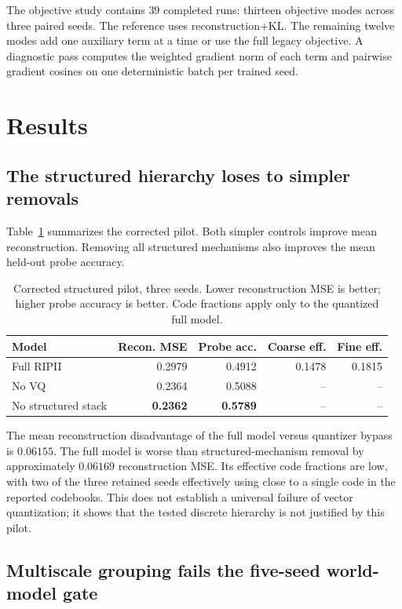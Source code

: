 \documentclass[10pt]{article}
\newcommand{\RIPII}{\textsc{RIPII}}
\begin{document}
The objective study contains $39$ completed runs: thirteen objective modes across three paired seeds. The reference uses reconstruction+KL. The remaining twelve modes add one auxiliary term at a time or use the full legacy objective. A diagnostic pass computes the weighted gradient norm of each term and pairwise gradient cosines on one deterministic batch per trained seed.

\section{Results}

\subsection{The structured hierarchy loses to simpler removals}

Table~\ref{tab:pilot} summarizes the corrected pilot. Both simpler controls improve mean reconstruction. Removing all structured mechanisms also improves the mean held-out probe accuracy.

\begin{table}[t]
\centering
\caption{Corrected structured pilot, three seeds. Lower reconstruction MSE is better; higher probe accuracy is better. Code fractions apply only to the quantized full model.}
\label{tab:pilot}
\begin{tabular}{lrrrr}
\toprule
Model & Recon. MSE & Probe acc. & Coarse eff. & Fine eff.\\
\midrule
Full \RIPII & 0.2979 & 0.4912 & 0.1478 & 0.1815\\
No VQ & 0.2364 & 0.5088 & -- & --\\
No structured stack & \textbf{0.2362} & \textbf{0.5789} & -- & --\\
\bottomrule
\end{tabular}
\end{table}

The mean reconstruction disadvantage of the full model versus quantizer bypass is $0.06155$. The full model is worse than structured-mechanism removal by approximately $0.06169$ reconstruction MSE. Its effective code fractions are low, with two of the three retained seeds effectively using close to a single code in the reported codebooks. This does not establish a universal failure of vector quantization; it shows that the tested discrete hierarchy is not justified by this pilot.

\subsection{Multiscale grouping fails the five-seed world-model gate}
\end{document}
